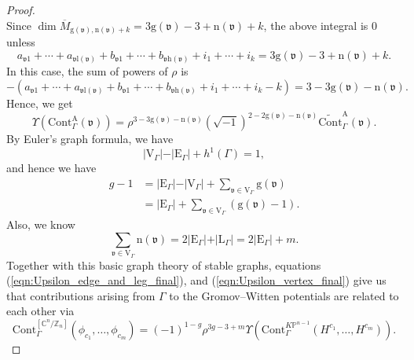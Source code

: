 \documentclass[12pt]{amsart}
\numberwithin{equation}{section}
\newcommand{\CnZn}{[\mathbb{C}^n/\mathbb{Z}_n]}
\newcommand{\KP}{K\mathbb{P}}
\begin{document}
\begin{proof}
\begin{equation*}
\end{equation*}
Since $\dim \overline{M}_{\mathrm{g}(\mathfrak{v}),\mathrm{n}(\mathfrak{v})+k}=3\mathrm{g}(\mathfrak{v})-3+\mathrm{n}(\mathfrak{v})+k$, the above integral is $0$ unless
\begin{equation*}
a_{\mathfrak{v}1}+\cdots + a_{\mathfrak{v}\mathrm{l}(\mathfrak{v})}+b_{\mathfrak{v}1}+\cdots + b_{\mathfrak{v}\mathrm{h}(\mathfrak{v})}+i_1+\cdots + i_k=3\mathrm{g}(\mathfrak{v})-3+\mathrm{n}(\mathfrak{v})+k.
\end{equation*}
In this case, the sum of powers of $\rho$ is
\begin{equation*}
-(a_{\mathfrak{v}1}+\cdots + a_{\mathfrak{v}\mathrm{l}(\mathfrak{v})}+b_{\mathfrak{v}1}+\cdots + b_{\mathfrak{v}\mathrm{h}(\mathfrak{v})}+i_1+\cdots + i_k-k)=3-3\mathrm{g}(\mathfrak{v})-\mathrm{n}(\mathfrak{v}).
\end{equation*}
Hence, we get
\begin{equation}\label{eqn:Upsilon_vertex_final}
\Upsilon\left(\mathrm{Cont}_{\Gamma}^{\mathrm{A}}(\mathfrak{v})\right)=\rho^{3-3\mathrm{g}(\mathfrak{v})-\mathrm{n}(\mathfrak{v})}\left(\sqrt{-1}\right)^{2-2\mathrm{g}(\mathfrak{v})-\mathrm{n}(\mathfrak{v})}\widetilde{\mathrm{Cont}}_{\Gamma}^{\mathrm{A}}(\mathfrak{v}).
\end{equation}
By Euler's graph formula, we have
\begin{equation*}
\vert\mathrm{V}_{\Gamma}\vert-\vert\mathrm{E}_{\Gamma}\vert+h^1(\Gamma)=1,
\end{equation*}
and hence we have
\begin{equation*}
\begin{aligned}
g-1
&=\vert\mathrm{E}_{\Gamma}\vert-\vert\mathrm{V}_{\Gamma}\vert+\sum_{\mathfrak{v}\in\mathrm{V}_{\Gamma}}\mathrm{g}(\mathfrak{v})\\
&=\vert\mathrm{E}_{\Gamma}\vert+\sum_{\mathfrak{v}\in\mathrm{V}_{\Gamma}}\left(\mathrm{g}(\mathfrak{v})-1\right).
\end{aligned}
\end{equation*}
Also, we know
\begin{equation*}
\sum_{\mathfrak{v}\in\mathrm{V}_{\Gamma}}\mathrm{n}(\mathfrak{v})=2\vert\mathrm{E}_{\Gamma}\vert+\vert\mathrm{L}_{\Gamma}\vert=2\vert\mathrm{E}_{\Gamma}\vert+m.
\end{equation*}
Together with this basic graph theory of stable graphs, equations (\ref{eqn:Upsilon_edge_and_leg_final}), and (\ref{eqn:Upsilon_vertex_final}) give us that contributions arising from $\Gamma$ to the Gromov--Witten potentials are related to each other via
\begin{equation*}
\mathrm{Cont}_{\Gamma}^{\CnZn}\left(\phi_{c_{1}}, \ldots, \phi_{c_{m}}\right)=(-1)^{1-g}\rho^{3g-3+m}\Upsilon \left(\mathrm{Cont}^{\KP^{n-1}}_{\Gamma}\left(H^{c_{1}}, \ldots, H^{c_{m}}\right)\right).
\end{equation*}
\end{proof}
\end{document}

